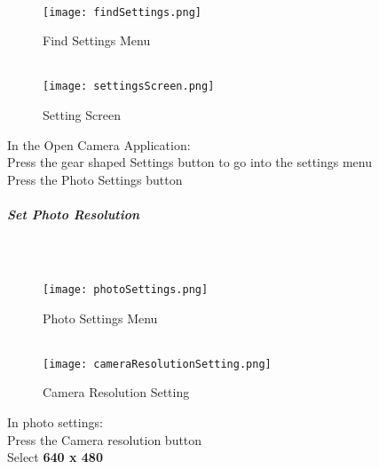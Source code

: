 \documentclass[class=article , crop=false, titlepage, twoside, multi={itemize, figure, verbatim}, float=false]{standalone}
\begin{document}
\subparagraph*{\\}
\begin{wrapfigure}{r}{0.5\textwidth}
\centering
\texttt{[image: findSettings.png]}
\caption{Find Settings Menu}
\vspace{.25in}
\HRule \\[.4cm] %
\vspace{.25in}
\texttt{[image: settingsScreen.png]}
\caption{Setting Screen}
\end{wrapfigure}
In the Open Camera Application:\\
\vspace{1in}
\noindent Press the gear shaped \Large Settings \normalsize button to go into the settings menu\\
\vspace{3in}
\noindent Press the \Large Photo Settings \normalsize button\\
\clearpage
\subparagraph*{Set Photo Resolution}
\subparagraph*{\\}
\begin{wrapfigure}{r}{0.5\textwidth}
\centering
\texttt{[image: photoSettings.png]}
\caption{Photo Settings Menu}
\vspace{.25in}
\HRule \\[.4cm] %
\vspace{.25in}
\texttt{[image: cameraResolutionSetting.png]}
\caption{Camera Resolution Setting}
\end{wrapfigure}
In \Large photo settings:\\
\vspace{1in}
\noindent Press the \Large Camera resolution \normalsize button\\
\vspace{3in}
\noindent Select \textbf{\LARGE 640 x 480}\\
\clearpage
\end{document}
